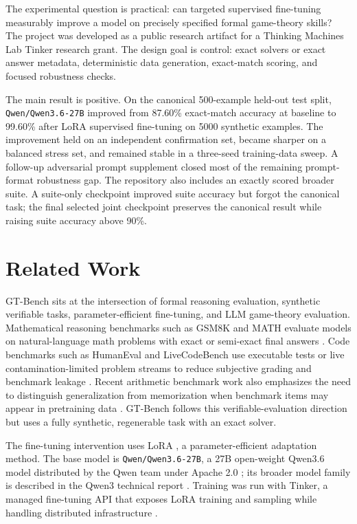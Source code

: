 \documentclass[11pt]{article}
\newcommand{\modelname}{\texttt{Qwen/\allowbreak Qwen3.6-27B}}
\begin{document}
The experimental question is practical: can targeted supervised fine-tuning measurably improve a model on precisely specified formal game-theory skills? The project was developed as a public research artifact for a Thinking Machines Lab Tinker research grant. The design goal is control: exact solvers or exact answer metadata, deterministic data generation, exact-match scoring, and focused robustness checks.

The main result is positive. On the canonical 500-example held-out test split, \modelname{} improved from 87.60\% exact-match accuracy at baseline to 99.60\% after LoRA supervised fine-tuning on 5000 synthetic examples. The improvement held on an independent confirmation set, became sharper on a balanced stress set, and remained stable in a three-seed training-data sweep. A follow-up adversarial prompt supplement closed most of the remaining prompt-format robustness gap. The repository also includes an exactly scored broader suite. A suite-only checkpoint improved suite accuracy but forgot the canonical task; the final selected joint checkpoint preserves the canonical result while raising suite accuracy above 90\%.

\section{Related Work}

GT-Bench sits at the intersection of formal reasoning evaluation, synthetic verifiable tasks, parameter-efficient fine-tuning, and LLM game-theory evaluation. Mathematical reasoning benchmarks such as GSM8K and MATH evaluate models on natural-language math problems with exact or semi-exact final answers \cite{cobbe2021gsm8k,hendrycks2021math}. Code benchmarks such as HumanEval and LiveCodeBench use executable tests or live contamination-limited problem streams to reduce subjective grading and benchmark leakage \cite{chen2021codex,jain2024livecodebench}. Recent arithmetic benchmark work also emphasizes the need to distinguish generalization from memorization when benchmark items may appear in pretraining data \cite{zhang2024gsm1k}. GT-Bench follows this verifiable-evaluation direction but uses a fully synthetic, regenerable task with an exact solver.

The fine-tuning intervention uses LoRA \cite{hu2022lora}, a parameter-efficient adaptation method. The base model is \modelname{}, a 27B open-weight Qwen3.6 model distributed by the Qwen team under Apache 2.0 \cite{qwen36modelcard}; its broader model family is described in the Qwen3 technical report \cite{yang2025qwen3}. Training was run with Tinker, a managed fine-tuning API that exposes LoRA training and sampling while handling distributed infrastructure \cite{tinker2025}.
\end{document}
